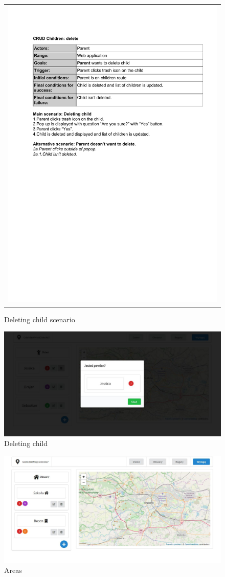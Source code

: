 \documentclass{sprawozdanie-agh}
\begin{document}
    	\begin{figure}[H]
    		\centering
    		\begin{tabular}{c}
    			\includegraphics[width=.80\textwidth]{deC_cropped}
    		\end{tabular}
    		\caption{Deleting child scenario}
    	\end{figure}

    	\begin{figure}[H]
    		\centering
    		\includegraphics[width=.80\textwidth]{deleteChild}
    		\caption{Deleting child}
    	\end{figure}

    	\begin{figure}[H]
    		\centering
    		\includegraphics[width=.80\textwidth]{areas}
    		\caption{Areas}
    	\end{figure}
\end{document}
